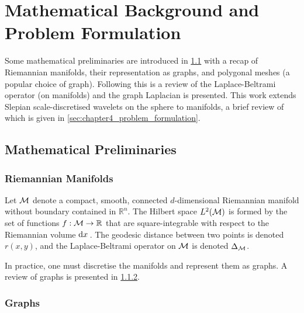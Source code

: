 \section{Mathematical Background and Problem Formulation}\label{sec:chapter4_mathematical_background_problem_formulation}

Some mathematical preliminaries are introduced in \cref{sec:chapter4_mathematical_preliminaries} with a recap of Riemannian manifolds, their representation as graphs, and polygonal meshes (a popular choice of graph).
Following this is a review of the Laplace-Beltrami operator (on manifolds) and the graph Laplacian is presented.
This work extends Slepian scale-discretised wavelets on the sphere to manifolds, a brief review of which is given in \cref{sec:chapter4_problem_formulation}.

\subsection{Mathematical Preliminaries}\label{sec:chapter4_mathematical_preliminaries}

\subsubsection{Riemannian Manifolds}

Let \(\mathcal{M}{}\) denote a compact, smooth, connected \(d\)-dimensional Riemannian manifold without boundary contained in \(\mathbb{R}^{n}\).
The Hilbert space \(L^{2}(\mathcal{M})\) is formed by the set of functions \(f : \mathcal{M} \to \mathbb{R}\) that are square-integrable with respect to the Riemannian volume \(\dd{x}{}\).
The geodesic distance between two points is denoted \(r(x,y)\), and the Laplace-Beltrami operator on \(\mathcal{M}{}\) is denoted \(\Delta_{\mathcal{M}}\).

In practice, one must discretise the manifolds and represent them as graphs.
A review of graphs is presented in \cref{sec:chapter4_graphs}.

\subsubsection{Graphs}\label{sec:chapter4_graphs}

